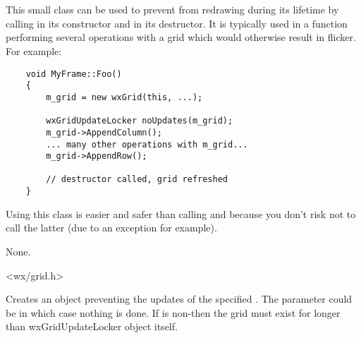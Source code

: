 
\section{}\label{wxgridupdatelocker}

This small class can be used to prevent  from redrawing
during its lifetime by calling 
in its constructor and  in its
destructor. It is typically used in a function performing several operations
with a grid which would otherwise result in flicker. For example:

{\small
\begin{verbatim}
    void MyFrame::Foo()
    {
        m_grid = new wxGrid(this, ...);

        wxGridUpdateLocker noUpdates(m_grid);
        m_grid->AppendColumn();
        ... many other operations with m_grid...
        m_grid->AppendRow();

        // destructor called, grid refreshed
    }
\end{verbatim}
}

Using this class is easier and safer than calling 
 and 
because you don't risk not to call the latter (due to an exception for example).


None.


<wx/grid.h>




\label{wxgridupdatelockerctor}


Creates an object preventing the updates of the specified . The
parameter could be \NULL in which case nothing is done. If  is
non-\NULL then the grid must exist for longer than wxGridUpdateLocker object
itself.

